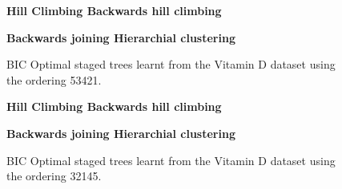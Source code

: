 \documentclass{tufte-book}
\begin{document}
\begin{figure}
   \begin{floatrow}
   \centering
   \textbf{\hspace{10mm}Hill Climbing \hspace{50mm} Backwards hill climbing}\par\medskip
{}%
\hfill
{}
   \end{floatrow}

   
      \begin{floatrow}
   \centering
   \textbf{\hspace{5mm}Backwards joining \hspace{55mm} Hierarchial clustering}\par\medskip
{}%
\hfill
{}%
   \end{floatrow}
   \caption{BIC Optimal staged trees learnt from the Vitamin D dataset using the ordering 53421.}
\end{figure}

\begin{figure}
   \begin{floatrow}
   \centering
   \textbf{\hspace{10mm}Hill Climbing \hspace{50mm} Backwards hill climbing}\par\medskip
{}%
\hfill
{}
   \end{floatrow}

   
      \begin{floatrow}
   \centering
   \textbf{\hspace{5mm}Backwards joining \hspace{55mm} Hierarchial clustering}\par\medskip
{}%
\hfill
{}%
   \end{floatrow}
   \caption{BIC Optimal staged trees learnt from the Vitamin D dataset using the ordering 32145.}
\end{figure}
\end{document}
